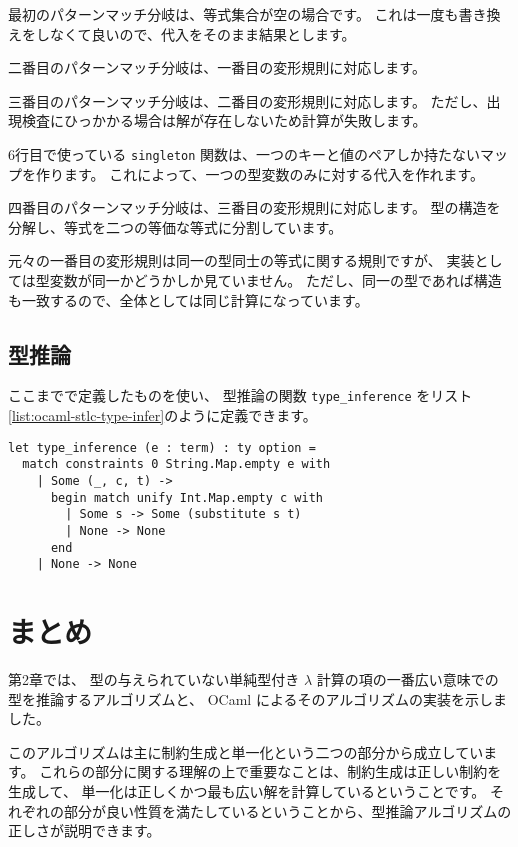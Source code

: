 最初のパターンマッチ分岐は、等式集合が空の場合です。
これは一度も書き換えをしなくて良いので、代入をそのまま結果とします。

二番目のパターンマッチ分岐は、一番目の変形規則に対応します。

三番目のパターンマッチ分岐は、二番目の変形規則に対応します。
ただし、出現検査にひっかかる場合は解が存在しないため計算が失敗します。

6行目で使っている \texttt{singleton} 関数は、一つのキーと値のペアしか持たないマップを作ります。
これによって、一つの型変数のみに対する代入を作れます。

四番目のパターンマッチ分岐は、三番目の変形規則に対応します。
型の構造を分解し、等式を二つの等価な等式に分割しています。

元々の一番目の変形規則は同一の型同士の等式に関する規則ですが、
実装としては型変数が同一かどうかしか見ていません。
ただし、同一の型であれば構造も一致するので、全体としては同じ計算になっています。

\subsection{型推論}

ここまでで定義したものを使い、
型推論の関数 \texttt{type\_inference} をリスト\ref{list:ocaml-stlc-type-infer}のように定義できます。

\begin{lstlisting}[caption=型推論, label=list:ocaml-stlc-type-infer]
let type_inference (e : term) : ty option =
  match constraints 0 String.Map.empty e with
    | Some (_, c, t) ->
      begin match unify Int.Map.empty c with
        | Some s -> Some (substitute s t)
        | None -> None
      end
    | None -> None
\end{lstlisting}

\section{まとめ}

第2章では、
型の与えられていない単純型付き $\lambda$ 計算の項の一番広い意味での型を推論するアルゴリズムと、
OCaml によるそのアルゴリズムの実装を示しました。

このアルゴリズムは主に制約生成と単一化という二つの部分から成立しています。
これらの部分に関する理解の上で重要なことは、制約生成は正しい制約を生成して、
単一化は正しくかつ最も広い解を計算しているということです。
それぞれの部分が良い性質を満たしているということから、型推論アルゴリズムの正しさが説明できます。

